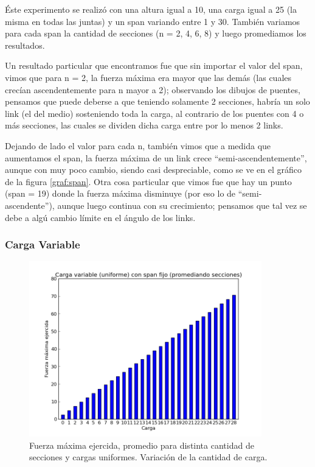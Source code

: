 \'Este experimento se realiz\'o con una altura igual a 10, una carga igual a 25 (la misma en todas las juntas) y un span variando entre 1 y 30. 
Tambi\'en variamos para cada span la cantidad de secciones (n = 2, 4, 6, 8) y luego promediamos los resultados. 

Un resultado particular que encontramos fue que sin importar el valor del span, vimos que para n = 2, la fuerza m\'axima era mayor que las dem\'as
(las cuales crec\'ian ascendentemente para n mayor a 2); observando los dibujos de puentes, pensamos que puede deberse a que teniendo solamente 2 secciones,
habr\'ia un solo link (el del medio) sosteniendo toda la carga, al contrario de los puentes con 4 o m\'as secciones, las cuales se dividen dicha carga
entre por lo menos 2 links.

Dejando de lado el valor para cada n, tambi\'en vimos que a medida que aumentamos el span, la fuerza m\'axima de un link crece ``semi-ascendentemente'', aunque con
muy poco cambio, siendo casi despreciable, como se ve en el gr\'afico de la figura \ref{graf:span}. Otra cosa particular que vimos fue que hay un punto (span = 19) donde la fuerza
m\'axima disminuye (por eso lo de ``semi-ascendente''), aunque luego continua con su crecimiento; pensamos que tal vez se debe a alg\'u cambio l\'imite 
en el \'angulo de los links.

 
\subsubsection{Carga Variable}

\begin{figure}[H]
  \centering
    \includegraphics[width=0.9\textwidth]{../mediciones/cargaVariable.png}
    \caption{Fuerza máxima ejercida, promedio para distinta cantidad de secciones y cargas uniformes. Variación de la cantidad de carga.}
   \label{graf:carga} 
\end{figure}

